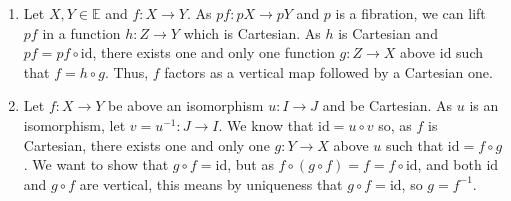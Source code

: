 \documentclass{report}
\newcommand{\bE}[0]{\mathbb E}
\newcommand{\bB}[0]{\mathbb B}
\newcommand{\idd}[0]{\mathrm{id}}
\begin{document}
\begin{answer}
    \begin{enumerate}[label=(\roman*)]
        \item Let $X,Y\in\bE$ and $f : X \to Y$. As $pf : pX\to pY$ and $p$ is a fibration, we can lift
        $pf$ in a function $h : Z \to Y$ which is Cartesian. As $h$ is Cartesian and $pf = pf\circ\idd$,
        there exists one and only one function $g : Z \to X$ above $\idd$ such that $f = h \circ g$. Thus,
        $f$ factors as a vertical map followed by a Cartesian one.
        \item Let $f : X \to Y$ be above an isomorphism $u : I \to J$ and be Cartesian. As $u$ is an
        isomorphism, let $v = u^{-1} : J \to I$. We know that $\idd = u\circ v$ so, as $f$ is Cartesian, there
        exists one and only one $g : Y \to X$ above $u$ such that $\idd = f \circ g$. We want to show that
        $g\circ f = \idd$, but as $f\circ (g\circ f) = f = f \circ \idd$, and both $\idd$ and $g\circ f$ are
        vertical, this means by uniqueness that $g\circ f = \idd$, so $g =f^{-1}$.
        \begin{center}
        \end{center}
    \end{enumerate}
\end{answer}
\end{document}
